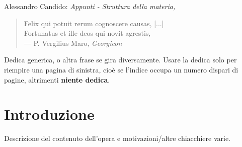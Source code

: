 \thispagestyle{empty}

\hfill

\vfill

\noindent Alessandro Candido: \textit{Appunti - Struttura della materia,}
\textcopyleft\ \DTMMonthname{\the\month} \the\year
\newline

\lipsum[2]

\setcounter{tocdepth}{2}
\tableofcontents
\markboth{\scshape{\contentsname}}{\scshape{\contentsname}}

\clearpage
{}
\thispagestyle{empty}

\vspace*{3cm}

\begin{quote}
	Felix qui potuit rerum cognoscere causas, [...] \\
	Fortunatus et ille deos qui novit agrestis, \\ \medskip
	--- P. Vergilius Maro, \textit{Georgicon}
\end{quote}

\medskip

\begin{center}
	Dedica generica, o altra frase se gira diversamente.
	Usare la dedica solo per riempire una pagina di sinistra, cioè se l'indice occupa un numero dispari di pagine, altrimenti \textbf{niente dedica}.
\end{center}


\chapter*{Introduzione}

Descrizione del contenuto dell'opera e motivazioni/altre chiacchiere varie.
\newline

\lipsum[1]
